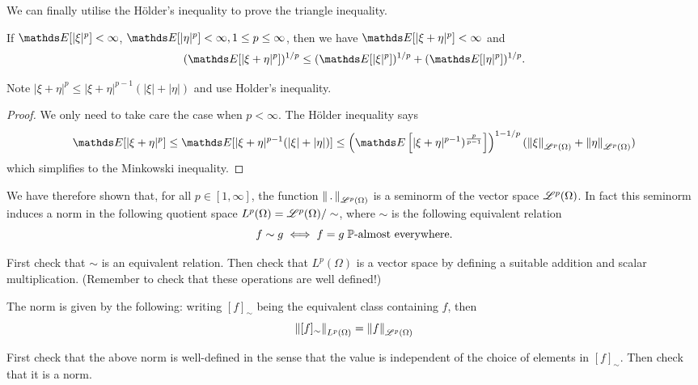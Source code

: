 We can finally utilise the Hölder's inequality to prove the triangle inequality.

\begin{proposition}
If $\E[|\xi|^p] < \infty$, $\E[|\eta|^p] < \infty, 1\le p \le \infty$, then we have $\E[|\xi + \eta|^p]<\infty$ and 
\begin{equation*}
    (\E[|\xi + \eta|^p])^{1/p} \le (\E[|\xi|^p])^{1/p} + (\E[|\eta|^p])^{1/p}.
\end{equation*}
\end{proposition}

\begin{hint}
Note $|\xi + \eta|^p \leq |\xi + \eta|^{p-1}(|\xi| + |\eta|)$ and use Holder's inequality.
\end{hint}

\begin{proof}
We only need to take care the case when $p<\infty$. The Hölder inequality says
\begin{equation}
    \E[|\xi + \eta|^p] \leq \E[|\xi + \eta|^{p-1} (|\xi| + |\eta|)] \leq \left(\E\sqbracket{|\xi + \eta|^{p-1})^{\frac{p}{p-1}}}\right)^{1-1/p} (\norm{\xi}_{\L^p(\Omega)} + \norm{\eta}_{\L^p(\Omega)})
\end{equation}
which simplifies to the Minkowski inequality.
\end{proof}

We have therefore shown that, for all $p \in [1,\infty]$, the function $\left\| \,.\, \right\|_{\mathcal{L}^p(\Omega)}$ is a seminorm of the vector space $\mathcal{L}^p(\Omega)$. In fact this seminorm induces a norm in the following quotient space $L^p(\Omega) = \mathcal{L}^p(\Omega) / \sim$, where $\sim$ is the following equivalent relation
\begin{equation} \label{eq:equiv_relation_Lp}
    f \sim g \iff f = g \; \mathbb{P}\text{-almost everywhere.} 
\end{equation}

\begin{unexaminable}
\begin{exercise}
First check that $\sim$ is an equivalent relation. Then check that $L^p(\Omega)$ is a vector space by defining a suitable addition and scalar multiplication. (Remember to check that these operations are well defined!)
\end{exercise}

The norm is given by the following: writing $[f]_\sim$ being the equivalent class containing $f$, then
\begin{equation}
    \left\| [f]_\sim \right\|_{L^p(\Omega)} = \left\| f \right\|_{\mathcal{L}^p(\Omega)}
\end{equation}

\begin{exercise}
First check that the above norm is well-defined in the sense that the value is independent of the choice of elements in $[f]_\sim$. Then check that it is a norm.
\end{exercise}
\end{unexaminable}

